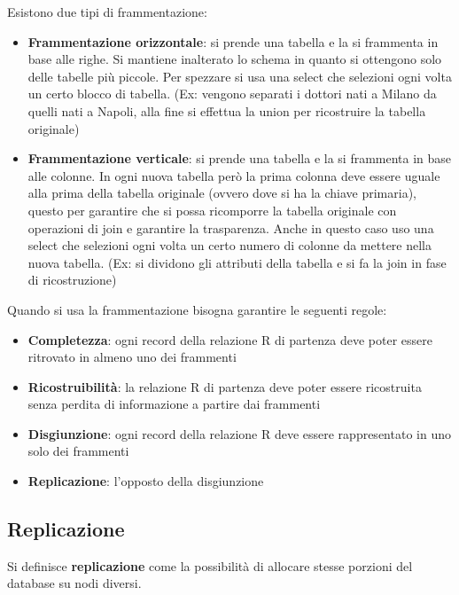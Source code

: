 Esistono due tipi di frammentazione:
\begin{itemize}
    \item \textbf{Frammentazione orizzontale}: si prende una tabella e la si
          frammenta in base alle righe. Si mantiene inalterato lo schema in
          quanto si ottengono solo delle tabelle più piccole. Per spezzare si
          usa una select che selezioni ogni volta un certo blocco di tabella.
          (Ex: vengono separati i dottori nati a Milano da quelli nati a Napoli,
          alla fine si effettua la union per ricostruire la tabella originale)
    \item \textbf{Frammentazione verticale}: si prende una tabella e la si frammenta
          in base alle colonne. In ogni nuova tabella però la prima colonna
          deve essere uguale alla prima della tabella originale (ovvero dove si
          ha la chiave primaria), questo per garantire che si possa ricomporre
          la tabella originale con operazioni di join e garantire la
          trasparenza. Anche in questo caso uso una select che selezioni ogni
          volta un certo numero di colonne da mettere nella nuova tabella.
          (Ex: si dividono gli attributi della tabella e si fa la join in fase di
          ricostruzione)
\end{itemize}
Quando si usa la frammentazione bisogna garantire le seguenti regole:
\begin{itemize}
    \item \textbf{Completezza}: ogni record della relazione R di partenza
          deve poter essere ritrovato in almeno uno dei frammenti
    \item \textbf{Ricostruibilità}: la relazione R di partenza deve poter essere
          ricostruita senza perdita di informazione a partire dai frammenti
    \item \textbf{Disgiunzione}: ogni record della relazione R deve essere
          rappresentato in uno solo dei frammenti
    \item \textbf{Replicazione}: l'opposto della disgiunzione
\end{itemize}
\subsection{Replicazione}

\begin{definizione}
    Si definisce \textbf{replicazione} come la possibilità di allocare stesse
    porzioni del database su nodi diversi.
\end{definizione}

